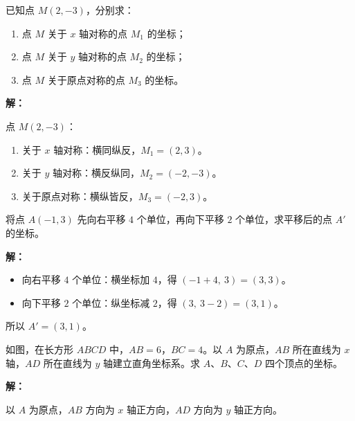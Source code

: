 \documentclass[12pt, a4paper]{ctexart}
\begin{document}
\bigskip

\begin{examplebox}[【例题4】对称点的坐标]
已知点 $M(2, -3)$，分别求：
\begin{enumerate}[label=(\arabic*)]
  \item 点 $M$ 关于 $x$ 轴对称的点 $M_1$ 的坐标；
  \item 点 $M$ 关于 $y$ 轴对称的点 $M_2$ 的坐标；
  \item 点 $M$ 关于原点对称的点 $M_3$ 的坐标。
\end{enumerate}
\end{examplebox}

\textbf{解：}

点 $M(2, -3)$：
\begin{enumerate}[label=(\arabic*)]
  \item 关于 $x$ 轴对称：横同纵反，$M_1 = (2, 3)$。
  \item 关于 $y$ 轴对称：横反纵同，$M_2 = (-2, -3)$。
  \item 关于原点对称：横纵皆反，$M_3 = (-2, 3)$。
\end{enumerate}

\bigskip

\begin{examplebox}[【例题5】平移问题]
将点 $A(-1, 3)$ 先向右平移 $4$ 个单位，再向下平移 $2$ 个单位，求平移后的点 $A'$ 的坐标。
\end{examplebox}

\textbf{解：}

\begin{itemize}[leftmargin=1.5em]
  \item 向右平移 $4$ 个单位：横坐标加 $4$，得 $(-1 + 4,\ 3) = (3, 3)$。
  \item 向下平移 $2$ 个单位：纵坐标减 $2$，得 $(3,\ 3 - 2) = (3, 1)$。
\end{itemize}

所以 $A' = \boxed{(3, 1)}$。

\bigskip

\begin{examplebox}[【例题6】建立坐标系解决几何问题]
如图，在长方形 $ABCD$ 中，$AB = 6$，$BC = 4$。以 $A$ 为原点，$AB$ 所在直线为 $x$ 轴，$AD$ 所在直线为 $y$ 轴建立直角坐标系。求 $A$、$B$、$C$、$D$ 四个顶点的坐标。
\end{examplebox}

\textbf{解：}

以 $A$ 为原点，$AB$ 方向为 $x$ 轴正方向，$AD$ 方向为 $y$ 轴正方向。
\end{document}

